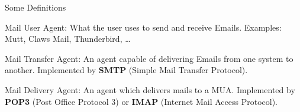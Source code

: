 \documentclass{lug}
\begin{document}
\begin{frame}{Some Definitions}
    \begin{description}[<+->]
        \item[MUA] Mail User Agent: What the user uses to send and receive
            Emails. Examples: Mutt, Claws Mail, Thunderbird, \dots
        \item[MTA] Mail Transfer Agent: An agent capable of delivering Emails
            from one system to another. Implemented by \textbf{SMTP} (Simple
            Mail Transfer Protocol).
        \item[MDA] Mail Delivery Agent: An agent which delivers mails to a MUA.
            Implemented by \textbf{POP3} (Post Office Protocol 3) or
            \textbf{IMAP} (Internet Mail Access Protocol).
    \end{description}
\end{frame}
\end{document}
